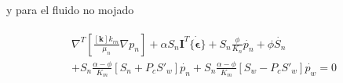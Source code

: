 y para el fluido no mojado

\begin{ceqn} 
\begin{subequations} \label{eq:equ344} 
\begin{gather}
\begin{multlined}
\nabla^T \left[\frac{[\mathbf{k}] k_{rn}}{\mu_{n}}\nabla p_{n}\right]
+ \alpha S_{n}\mathbf{I}^T \dot{\{\mathbf{\epsilon}\}} + S_{n}\frac{\phi}{K_{n}}\dot{p_{n}} + \phi\dot{S_{n}}\\[10pt]
+ S_{n} \frac{\alpha - \phi}{K_m}\left[S_n + P_c S'_w\right]\dot{p_n} 
+ S_{n} \frac{\alpha - \phi}{K_m}\left[S_w - P_c S'_w\right]\dot{p_w} = 0
\end{multlined}
\end{gather}  
\end{subequations} 
\end{ceqn}
\\

